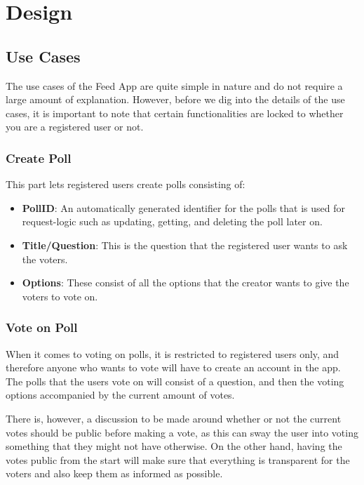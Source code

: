 \usepackage{float}

\section{Design}
\label{sec:design}

\subsection{Use Cases}
The use cases of the Feed App are quite simple in nature and do not require a large amount of explanation. However, before we dig into the details of the use cases, it is important to note that certain functionalities are locked to whether you are a registered user or not.

\subsubsection{Create Poll}
This part lets registered users create polls consisting of:
\begin{itemize}
    \item \textbf{PollID}: An automatically generated identifier for the polls that is used for request-logic such as updating, getting, and deleting the poll later on.
    \item \textbf{Title/Question}: This is the question that the registered user wants to ask the voters.
    \item \textbf{Options}: These consist of all the options that the creator wants to give the voters to vote on.
\end{itemize}

\subsubsection{Vote on Poll}
When it comes to voting on polls, it is restricted to registered users only, and therefore anyone who wants to vote will have to create an account in the app. The polls that the users vote on will consist of a question, and then the voting options accompanied by the current amount of votes. 

There is, however, a discussion to be made around whether or not the current votes should be public before making a vote, as this can sway the user into voting something that they might not have otherwise. On the other hand, having the votes public from the start will make sure that everything is transparent for the voters and also keep them as informed as possible.

